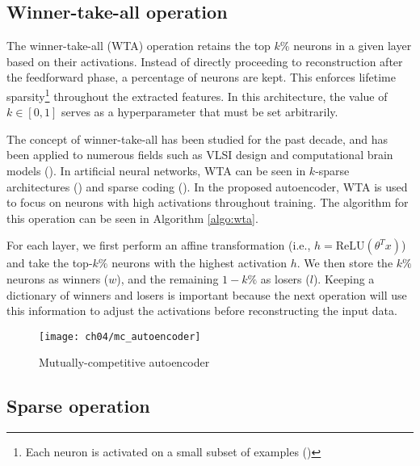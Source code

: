 \subsection{Winner-take-all operation}

\par The winner-take-all (WTA) operation retains the top $k$\% neurons in a
given layer based on their activations. Instead of directly proceeding to
reconstruction after the feedforward phase, a percentage of neurons are kept.
This enforces lifetime sparsity\footnote{ Each neuron is activated on a small
subset of examples (\cite{willmore2001characterizing}) } throughout the
extracted features. In this architecture, the value of $k \in
\left[0,1\right]$ serves as a hyperparameter that must be set arbitrarily.

\par The concept of winner-take-all has been studied for the past decade, and
has been applied to numerous fields such as VLSI design and computational
brain models (\cite{maass2000computational}). In artificial neural networks,
WTA can be seen in $k$-sparse architectures (\cite{coates2011sparse,
makhzani2014ksparse, makhzani2015winner}) and sparse coding
(\cite{lee2007efficient, olshausen1996emergence}). In the proposed
autoencoder, WTA is used to focus on neurons with high activations throughout
training. The algorithm for this operation can be seen in Algorithm
\ref{algo:wta}.

\par For each layer, we first perform an affine transformation  (i.e., $h =
\text{ReLU}(\theta^{T}x)$) and take the top-$k\%$ neurons with the highest
activation $h$.  We then store the $k\%$ neurons as winners ($w$), and the
remaining $1-k\%$ as losers ($l$). Keeping a dictionary of winners and losers
is important because the next operation will use this information to adjust the
activations before reconstructing the input data.

\begin{figure}[!t]
  \centering
  \texttt{[image: ch04/mc\_autoencoder]}
  \caption[Mutually-competitive autoencoder architecture]
  {Mutually-competitive autoencoder}
  \label{schema:mc_autoencoder}
\end{figure}



\subsection{Sparse operation}

